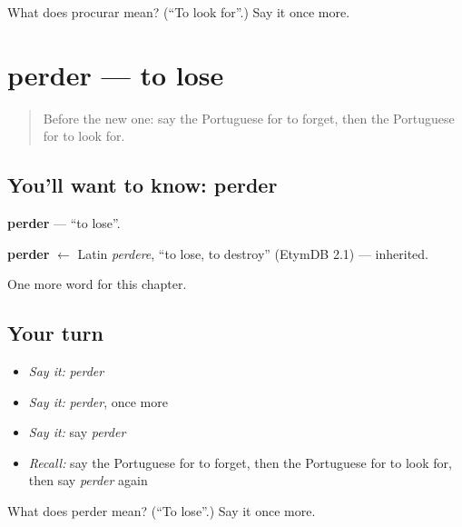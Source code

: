 \begin{tcolorbox}[breakable,colback=teal!4,colframe=teal!35!black,title={Before you move on}]
What does procurar mean? (\textquotedblleft{}To look for\textquotedblright{}.) Say it once more.
\end{tcolorbox}
\section[perder]{perder — to lose}

\label{lesson:PT-C81-perder}



\begin{quote}
Before the new one: say the Portuguese for to forget, then the Portuguese for to look for.
\end{quote}

\subsection*{You'll want to know: perder}
\textbf{perder} — \textquotedblleft{}to lose\textquotedblright{}.

\begin{cousinweb}
\textbf{perder} $\leftarrow$ Latin \emph{perdere}, \textquotedblleft{}to lose, to destroy\textquotedblright{} (EtymDB 2.1) — inherited.
\end{cousinweb}

\begin{grammarlens}[title={What you've built}]
One more word for this chapter.
\end{grammarlens}

\subsection*{Your turn}
\begin{itemize}
\raggedright
  \item \emph{Say it:} \emph{perder}
  \item \emph{Say it:} \emph{perder}, once more
  \item \emph{Say it:} say \emph{perder}
  \item \emph{Recall:} say the Portuguese for to forget, then the Portuguese for to look for, then say \emph{perder} again
\end{itemize}

\begin{tcolorbox}[breakable,colback=teal!4,colframe=teal!35!black,title={Before you move on}]
What does perder mean? (\textquotedblleft{}To lose\textquotedblright{}.) Say it once more.
\end{tcolorbox}
